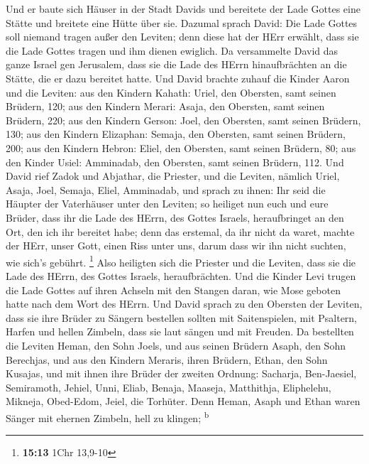  Und er baute sich Häuser in der Stadt Davids und
bereitete der Lade Gottes eine Stätte und breitete eine Hütte über sie.
 Dazumal sprach David: Die Lade Gottes soll niemand tragen
außer den Leviten; denn diese hat der HErr erwählt, dass sie die Lade
Gottes tragen und ihm dienen ewiglich.  Da versammelte
David das ganze Israel gen Jerusalem, dass sie die Lade des HErrn
hinaufbrächten an die Stätte, die er dazu bereitet hatte. 
Und David brachte zuhauf die Kinder Aaron und die Leviten:
 aus den Kindern Kahath: Uriel, den Obersten, samt seinen
Brüdern, 120;  aus den Kindern Merari: Asaja, den
Obersten, samt seinen Brüdern, 220;  aus den Kindern
Gerson: Joel, den Obersten, samt seinen Brüdern, 130;  aus
den Kindern Elizaphan: Semaja, den Obersten, samt seinen Brüdern, 200;
 aus den Kindern Hebron: Eliel, den Obersten, samt seinen
Brüdern, 80;  aus den Kinder Usiel: Amminadab, den
Obersten, samt seinen Brüdern, 112.  Und David rief Zadok
und Abjathar, die Priester, und die Leviten, nämlich Uriel, Asaja, Joel,
Semaja, Eliel, Amminadab,  und sprach zu ihnen: Ihr seid
die Häupter der Vaterhäuser unter den Leviten; so heiliget nun euch und
eure Brüder, dass ihr die Lade des HErrn, des Gottes Israels,
heraufbringet an den Ort, den ich ihr bereitet habe; 
denn das erstemal, da ihr nicht da waret, machte der HErr, unser Gott,
einen Riss unter uns, darum dass wir ihn nicht suchten, wie sich's
gebührt. \footnote{\textbf{15:13} 1Chr 13,9-10}  Also
heiligten sich die Priester und die Leviten, dass sie die Lade des
HErrn, des Gottes Israels, heraufbrächten.  Und die
Kinder Levi trugen die Lade Gottes auf ihren Achseln mit den Stangen
daran, wie Mose geboten hatte nach dem Wort des HErrn. 
Und David sprach zu den Obersten der Leviten, dass sie ihre Brüder zu
Sängern bestellen sollten mit Saitenspielen, mit Psaltern, Harfen und
hellen Zimbeln, dass sie laut sängen und mit Freuden.  Da
bestellten die Leviten Heman, den Sohn Joels, und aus seinen Brüdern
Asaph, den Sohn Berechjas, und aus den Kindern Meraris, ihren Brüdern,
Ethan, den Sohn Kusajas,  und mit ihnen ihre Brüder der
zweiten Ordnung: Sacharja, Ben-Jaesiel, Semiramoth, Jehiel, Unni, Eliab,
Benaja, Maaseja, Matthithja, Eliphelehu, Mikneja, Obed-Edom, Jeiel, die
Torhüter.  Denn Heman, Asaph und Ethan waren Sänger mit
ehernen Zimbeln, hell zu klingen; \textsuperscript{b} 
